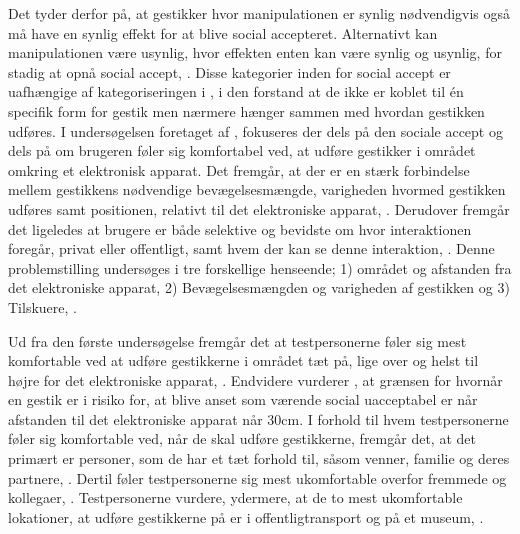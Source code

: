 Det tyder derfor på, at gestikker hvor manipulationen er synlig nødvendigvis også må have en synlig effekt for at blive social accepteret. Alternativt kan manipulationen være usynlig, hvor effekten enten kan være synlig og usynlig, for stadig at opnå social accept, \parencite[s. 278]{PDF:WouldYouDoThat}. Disse kategorier inden for social accept er uafhængige af kategoriseringen i , i den forstand at de ikke er koblet til én specifik form for gestik men nærmere hænger sammen med hvordan gestikken udføres.\blankline
%
I undersøgelsen foretaget af \textcite[s. 193]{PDF:AreYouComfortableDoingThat}, fokuseres der dels på den sociale accept og dels på om brugeren føler sig komfortabel ved, at udføre gestikker i området omkring et elektronisk apparat. Det fremgår, at der er en stærk forbindelse mellem gestikkens nødvendige bevægelsesmængde, varigheden hvormed gestikken udføres samt positionen, relativt til det elektroniske apparat, \parencite[s. 193]{PDF:AreYouComfortableDoingThat}. Derudover fremgår det ligeledes at brugere er både selektive og bevidste om hvor interaktionen foregår, privat eller offentligt, samt hvem der kan se denne interaktion, \parencite[s. 193]{PDF:AreYouComfortableDoingThat}. Denne problemstilling undersøges i tre forskellige henseende; 1) området og afstanden fra det elektroniske apparat, 2) Bevægelsesmængden og varigheden af gestikken og 3) Tilskuere, \parencite[ss. 195-200]{PDF:AreYouComfortableDoingThat}. 

Ud fra den første undersøgelse fremgår det at testpersonerne føler sig mest komfortable ved at udføre gestikkerne i området tæt på, lige over og helst til højre for det elektroniske apparat, \parencite[s. 197]{PDF:AreYouComfortableDoingThat}. Endvidere vurderer \textcite[s. 201]{PDF:AreYouComfortableDoingThat}, at grænsen for hvornår en gestik er i risiko for, at blive anset som værende social uacceptabel er når afstanden til det elektroniske apparat når 30cm. I forhold til hvem testpersonerne føler sig komfortable ved, når de skal udføre gestikkerne, fremgår det, at det primært er personer, som de har et tæt forhold til, såsom venner, familie og deres partnere, \parencite[s. 196]{PDF:AreYouComfortableDoingThat}. Dertil føler testpersonerne sig mest ukomfortable overfor fremmede og kollegaer, \parencite[s. 196]{PDF:AreYouComfortableDoingThat}. Testpersonerne vurdere, ydermere, at de to mest ukomfortable lokationer, at udføre gestikkerne på er i offentligtransport og på et museum, \parencite[s. 196]{PDF:AreYouComfortableDoingThat}. 

